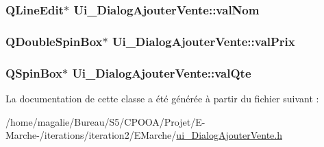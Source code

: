 \hypertarget{class_ui___dialog_ajouter_vente_a7f6dc97a576b62dc8412a347ec2acb25}{
\subsubsection[{val\-Nom}]{\setlength{\rightskip}{0pt plus 5cm}Q\-Line\-Edit$\ast$ Ui\-\_\-\-Dialog\-Ajouter\-Vente\-::val\-Nom}}\label{class_ui___dialog_ajouter_vente_a7f6dc97a576b62dc8412a347ec2acb25}
\hypertarget{class_ui___dialog_ajouter_vente_a125862f438ab182a8a49357a91bb37ef}{
\subsubsection[{val\-Prix}]{\setlength{\rightskip}{0pt plus 5cm}Q\-Double\-Spin\-Box$\ast$ Ui\-\_\-\-Dialog\-Ajouter\-Vente\-::val\-Prix}}\label{class_ui___dialog_ajouter_vente_a125862f438ab182a8a49357a91bb37ef}
\hypertarget{class_ui___dialog_ajouter_vente_a763e8a0d9e253d6da640fbac8b02459c}{
\subsubsection[{val\-Qte}]{\setlength{\rightskip}{0pt plus 5cm}Q\-Spin\-Box$\ast$ Ui\-\_\-\-Dialog\-Ajouter\-Vente\-::val\-Qte}}\label{class_ui___dialog_ajouter_vente_a763e8a0d9e253d6da640fbac8b02459c}


La documentation de cette classe a été générée à partir du fichier suivant \-:\begin{DoxyCompactItemize}
\item 
/home/magalie/\-Bureau/\-S5/\-C\-P\-O\-O\-A/\-Projet/\-E-\/\-Marche-\//iterations/iteration2/\-E\-Marche/\hyperlink{ui___dialog_ajouter_vente_8h}{ui\-\_\-\-Dialog\-Ajouter\-Vente.\-h}\end{DoxyCompactItemize}
